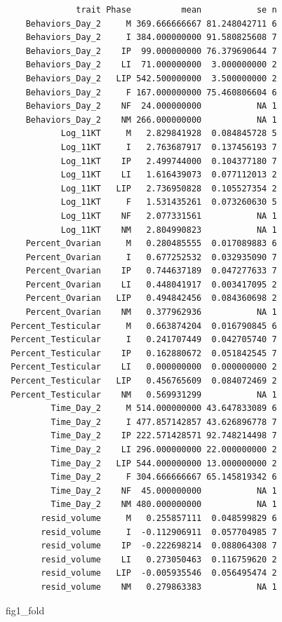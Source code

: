 \documentclass[
  landscape]{article}
\newenvironment{Shaded}{\begin{snugshade}}{\end{snugshade}}
\newcommand{\NormalTok}[1]{#1}
\begin{document}
\begin{verbatim}
              trait Phase          mean           se n
    Behaviors_Day_2     M 369.666666667 81.248042711 6
    Behaviors_Day_2     I 384.000000000 91.580825608 7
    Behaviors_Day_2    IP  99.000000000 76.379690644 7
    Behaviors_Day_2    LI  71.000000000  3.000000000 2
    Behaviors_Day_2   LIP 542.500000000  3.500000000 2
    Behaviors_Day_2     F 167.000000000 75.460806604 6
    Behaviors_Day_2    NF  24.000000000           NA 1
    Behaviors_Day_2    NM 266.000000000           NA 1
           Log_11KT     M   2.829841928  0.084845728 5
           Log_11KT     I   2.763687917  0.137456193 7
           Log_11KT    IP   2.499744000  0.104377180 7
           Log_11KT    LI   1.616439073  0.077112013 2
           Log_11KT   LIP   2.736950828  0.105527354 2
           Log_11KT     F   1.531435261  0.073260630 5
           Log_11KT    NF   2.077331561           NA 1
           Log_11KT    NM   2.804990823           NA 1
    Percent_Ovarian     M   0.280485555  0.017089883 6
    Percent_Ovarian     I   0.677252532  0.032935090 7
    Percent_Ovarian    IP   0.744637189  0.047277633 7
    Percent_Ovarian    LI   0.448041917  0.003417095 2
    Percent_Ovarian   LIP   0.494842456  0.084360698 2
    Percent_Ovarian    NM   0.377962936           NA 1
 Percent_Testicular     M   0.663874204  0.016790845 6
 Percent_Testicular     I   0.241707449  0.042705740 7
 Percent_Testicular    IP   0.162880672  0.051842545 7
 Percent_Testicular    LI   0.000000000  0.000000000 2
 Percent_Testicular   LIP   0.456765609  0.084072469 2
 Percent_Testicular    NM   0.569931299           NA 1
         Time_Day_2     M 514.000000000 43.647833089 6
         Time_Day_2     I 477.857142857 43.626896778 7
         Time_Day_2    IP 222.571428571 92.748214498 7
         Time_Day_2    LI 296.000000000 22.000000000 2
         Time_Day_2   LIP 544.000000000 13.000000000 2
         Time_Day_2     F 304.666666667 65.145819342 6
         Time_Day_2    NF  45.000000000           NA 1
         Time_Day_2    NM 480.000000000           NA 1
       resid_volume     M   0.255857111  0.048599829 6
       resid_volume     I  -0.112906911  0.057704985 7
       resid_volume    IP  -0.222698214  0.088064308 7
       resid_volume    LI   0.273050463  0.116759620 2
       resid_volume   LIP  -0.005935546  0.056495474 2
       resid_volume    NM   0.279863383           NA 1
\end{verbatim}

\begin{Shaded}
\begin{Highlighting}[]
\NormalTok{fig1\_fold}
\end{Highlighting}
\end{Shaded}
\end{document}
